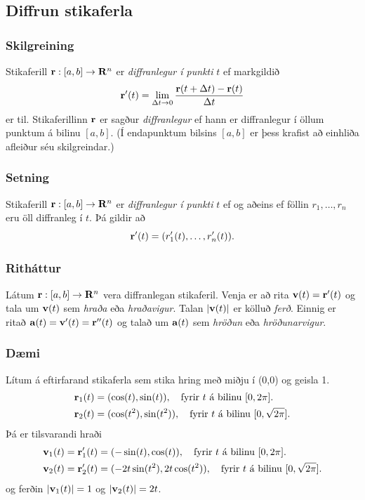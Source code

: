 \subsection{Diffrun stikaferla}
 \subsubsection{Skilgreining }
Stikaferill $\mbox{${\bf r}$}:  [a,b]\rightarrow \mbox{${\bf R}^n$}$ er
{\em diffranlegur í punkti} $t$ ef markgildið 
$$\mbox{${\bf r}$}'(t)=\lim_{\Delta t\rightarrow 0}\frac{\mbox{${\bf r}$}(t+\Delta t)-\mbox{${\bf r}$}(t)}{\Delta t}$$
er til.  Stikaferillinn $\mbox{${\bf r}$}$ er sagður {\em diffranlegur} ef hann er
diffranlegur í öllum punktum á bilinu $[a,b]$.  (Í endapunktum bilsins
$[a,b]$ er þess krafist að einhliða afleiður séu skilgreindar.)


\subsubsection{\nopagebreak Setning }  
   Stikaferill $\mbox{${\bf r}$}:  [a,b]\rightarrow \mbox{${\bf R}^n$}$ er
{\em diffranlegur í punkti} $t$ ef og aðeins ef föllin $r_1,\ldots,r_n$ eru
öll diffranleg í $t$.  Þá gildir að  
$$\mbox{${\bf r}$}'(t)=(r'_1(t),\ldots,r'_n(t)).$$ 
 
 \pause
\subsubsection{\nopagebreak Ritháttur }   Látum $\mbox{${\bf r}$}:  [a,b]\rightarrow \mbox{${\bf R}^n$}$ vera diffranlegan stikaferil.  Venja er að rita $\mbox{${\bf v}$}(t)=\mbox{${\bf r}$}'(t)$ og tala um
$\mbox{${\bf v}$}(t)$ sem {\em hraða} eða {\em hraðavigur}.   Talan $|\mbox{${\bf v}$}(t)|$ er
kölluð {\em ferð}.   Einnig er ritað $\mbox{${\bf a}$}(t)=\mbox{${\bf v}$}'(t)=\mbox{${\bf r}$}''(t)$ og talað
um $\mbox{${\bf a}$}(t)$ sem {\em hröðun} eða {\em hröðunarvigur}.  



 \subsubsection{\nopagebreak Dæmi }
Lítum á eftirfarand stikaferla sem stika hring með miðju í (0,0) og geisla 1.
 \begin{align*}
\mbox{${\bf r}$}_1(t) &= (\cos(t),\sin(t)), \quad \text{fyrir $t$ á bilinu $[0,2\pi].$} \\
\mbox{${\bf r}$}_2(t) &= (\cos(t^2),\sin(t^2)), \quad \text{fyrir $t$ á bilinu $[0,\sqrt{2\pi}].$} 
\end{align*}
Þá er tilsvarandi hraði
 \begin{align*}
\mbox{${\bf v}$}_1(t) = \mbox{${\bf r}$}_1'(t) &= (-\sin(t),\cos(t)), \quad \text{fyrir $t$ á bilinu $[0,2\pi].$} \\
\mbox{${\bf v}$}_2(t) = \mbox{${\bf r}$}_2'(t) &= (-2t\sin(t^2),2t\cos(t^2)),  \quad \text{fyrir $t$ á bilinu $[0,\sqrt{2\pi}].$}
\end{align*}
og ferðin $|\mbox{${\bf v}$}_1(t)| = 1$ og $|\mbox{${\bf v}$}_2(t)| = 2t$.
 


